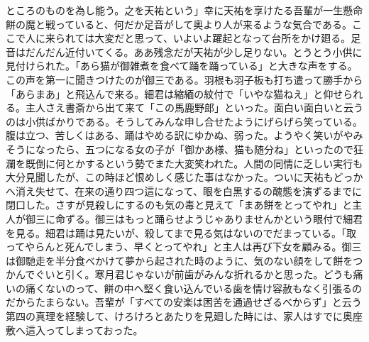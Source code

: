 \documentclass[12pt, openright]{book}
\begin{document}
ところのものを為し能う。之を天祐という」幸に天祐を享けたる吾輩が一生懸命餅の魔と戦っていると、何だか足音がして奥より人が来るような気合である。ここで人に来られては大変だと思って、いよいよ躍起となって台所をかけ廻る。足音はだんだん近付いてくる。ああ残念だが天祐が少し足りない。とうとう小供に見付けられた。「あら猫が御雑煮を食べて踊を踊っている」と大きな声をする。この声を第一に聞きつけたのが御三である。羽根も羽子板も打ち遣って勝手から「あらまあ」と飛込んで来る。細君は縮緬の紋付で「いやな猫ねえ」と仰せられる。主人さえ書斎から出て来て「この馬鹿野郎」といった。面白い面白いと云うのは小供ばかりである。そうしてみんな申し合せたようにげらげら笑っている。腹は立つ、苦しくはある、踊はやめる訳にゆかぬ、弱った。ようやく笑いがやみそうになったら、五つになる女の子が「御かあ様、猫も随分ね」といったので狂瀾を既倒に何とかするという勢でまた大変笑われた。人間の同情に乏しい実行も大分見聞したが、この時ほど恨めしく感じた事はなかった。ついに天祐もどっかへ消え失せて、在来の通り四つ這になって、眼を白黒するの醜態を演ずるまでに閉口した。さすが見殺しにするのも気の毒と見えて「まあ餅をとってやれ」と主人が御三に命ずる。御三はもっと踊らせようじゃありませんかという眼付で細君を見る。細君は踊は見たいが、殺してまで見る気はないのでだまっている。「取ってやらんと死んでしまう、早くとってやれ」と主人は再び下女を顧みる。御三は御馳走を半分食べかけて夢から起された時のように、気のない顔をして餅をつかんでぐいと引く。寒月君じゃないが前歯がみんな折れるかと思った。どうも痛いの痛くないのって、餅の中へ堅く食い込んでいる歯を情け容赦もなく引張るのだからたまらない。吾輩が「すべての安楽は困苦を通過せざるべからず」と云う第四の真理を経験して、けろけろとあたりを見廻した時には、家人はすでに奥座敷へ這入ってしまっておった。
\end{document}
